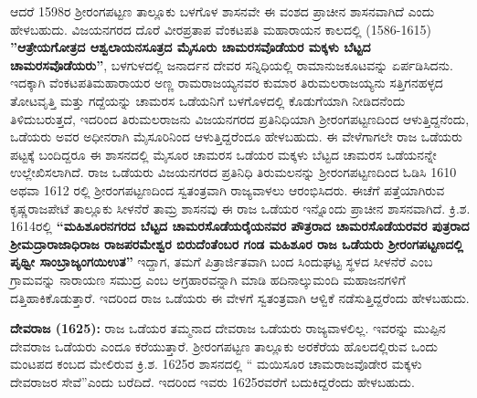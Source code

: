 ಆದರೆ 1598ರ ಶ‍್ರೀರಂಗಪಟ್ಟಣ ತಾಲ್ಲೂಕು ಬಳಗೊಳ ಶಾಸನವೇ ಈ ವಂಶದ ಪ್ರಾಚೀನ ಶಾಸನವಾಗಿದೆ ಎಂದು ಹೇಳಬಹುದು. ವಿಜಯನಗರದ ದೊರೆ ವೀರಪ್ರತಾಪ ವೆಂಕಟಪತಿ ಮಹಾರಾಯನ ಕಾಲದಲ್ಲಿ (1586-1615) \textbf{''ಆತ್ರೇಯಗೋತ್ರದ ಆಶ್ವಲಾಯನ\-ಸೂತ್ರದ ಮೈಸೂರು ಚಾಮರಸವೊಡೆಯರ ಮಕ್ಕಳು ಬೆಟ್ಟದ ಚಾಮರಸವೊಡೆಯರು''}, ಬಳಗುಳದಲ್ಲಿ ಜನಾರ್ದನ ದೇವರ ಸನ್ನಿಧಿಯಲ್ಲಿ ರಾಮಾನುಜಕೂಟವನ್ನು ಏರ್ಪಡಿಸಿದನು. ಇದಕ್ಕಾಗಿ ವೆಂಕಟಪತಿಮಹಾರಾಯರ ಅಣ್ಣ ರಾಮರಾಜಯ್ಯ\-ನವರ ಕುಮಾರ ತಿರುಮಲರಾಜಯ್ಯನು ಸತ್ತಿಗನಹಳ್ಳದ ತೋಟವೃತ್ತಿ ಮತ್ತು ಗದ್ದೆಯನ್ನು ಚಾಮರಸ ಒಡೆಯನಿಗೆ ಬಳಗೊಳದಲ್ಲಿ ಕೊಡುಗೆಯಾಗಿ ನೀಡಿದನೆಂದು ತಿಳಿದುಬರುತ್ತದೆ, ಇದರಿಂದ ತಿರುಮಲರಾಜನು ವಿಜಯನಗರದ ಪ್ರತಿನಿಧಿಯಾಗಿ ಶ‍್ರೀರಂಗಪಟ್ಟಣದಿಂದ ಆಳುತ್ತಿದ್ದನೆಂದು, ಒಡೆಯರು ಅವರ ಅಧೀನರಾಗಿ ಮೈಸೂರಿನಿಂದ ಆಳುತ್ತಿದ್ದರೆಂದೂ ಹೇಳಬಹುದು. ಈ ವೇಳೆಗಾಗಲೇ ರಾಜ ಒಡೆಯರು ಪಟ್ಟಕ್ಕೆ ಬಂದಿದ್ದರೂ ಈ ಶಾಸನದಲ್ಲಿ ಮೈಸೂರ ಚಾಮರಸ ಒಡೆಯರ ಮಕ್ಕಳು ಬೆಟ್ಟದ ಚಾಮರಸ ಒಡೆಯನನ್ನೇ ಉಲ್ಲೇಖಿಸ\-ಲಾಗಿದೆ. ರಾಜ ಒಡೆಯರು ವಿಜಯನಗರದ ಪ್ರತಿನಿಧಿ ತಿರುಮಲನನ್ನು ಶ‍್ರೀರಂಗಪಟ್ಟಣದಿಂದ ಓಡಿಸಿ 1610 ಅಥವಾ 1612 ರಲ್ಲಿ ಶ‍್ರೀರಂಗಪಟ್ಟಣದಿಂದ ಸ್ವತಂತ್ರವಾಗಿ ರಾಜ್ಯವಾಳಲು ಆರಂಭಿಸಿದರು. ಈಚೆಗೆ ಪತ್ತೆಯಾಗಿರುವ ಕೃಷ್ಣರಾಜಪೇಟೆ ತಾಲ್ಲೂಕು ಸೀಳನೆರೆ ತಾಮ್ರ ಶಾಸನವು ಈ ರಾಜ ಒಡೆಯರ ಇನ್ನೊಂದು ಪ್ರಾಚೀನ ಶಾಸನವಾಗಿದೆ. ಕ್ರಿ.ಶ. 1614ರಲ್ಲಿ \textbf{“ಮಹಿಶೂರನಗರದ ಬೆಟ್ಟದ ಚಾಮರಸೊಡೆಯರೈಯನವರ ಪೌತ್ರರಾದ ಚಾಮರಸೊಡೆಯರವರ ಪುತ್ರರಾದ ಶ‍್ರೀಮದ್ರಾರಾಜಾಧಿರಾಜ ರಾಜಪರಮೇಶ್ವರ ಬಿರುದೆಂತೆಂಬರ ಗಂಡ ಮಹಿಶೂರ ರಾಜ ಒಡೆಯರು ಶ‍್ರೀರಂಗಪಟ್ಟಣದಲ್ಲಿ ಪೃಥ್ವೀ ಸಾಂಬ್ರಾಜ್ಯಂಗಯಿಉತ”} ಇದ್ದಾಗ, ತಮಗೆ ಪಿತ್ರಾರ್ಜಿತವಾಗಿ ಬಂದ ಸಿಂದುಘಟ್ಟ ಸ್ಥಳದ ಸೀಳನೆರೆ ಎಂಬ ಗ್ರಾಮವನ್ನು ನಾರಾಯಣ ಸಮುದ್ರ ಎಂಬ ಅಗ್ರಹಾರವನ್ನಾಗಿ ಮಾಡಿ ಹದಿನಾಲ್ಕುಮಂದಿ ಮಹಾಜನಗಳಿಗೆ ದತ್ತಿಹಾಕಿಕೊಡುತ್ತಾರೆ. ಇದರಿಂದ ರಾಜ ಒಡೆಯರು ಈ ವೇಳಗೆ ಸ್ವತಂತ್ರವಾಗಿ ಆಳ್ವಿಕೆ ನಡೆಸುತ್ತಿದ್ದರೆಂದು ಹೇಳಬಹುದು.

\textbf{ದೇವರಾಜ (1625): } ರಾಜ ಒಡೆಯರ ತಮ್ಮನಾದ ದೇವರಾಜ ಒಡೆಯರು ರಾಜ್ಯವಾಳಲಿಲ್ಲ. ಇವರನ್ನು ಮುಪ್ಪಿನ ದೇವರಾಜ ಒಡೆಯರು ಎಂದೂ ಕರೆಯುತ್ತಾರೆ. ಶ‍್ರೀರಂಗಪಟ್ಟಣ ತಾಲ್ಲೂಕು ಅರಕೆರೆಯ ಹೊಲದಲ್ಲಿರುವ ಒಂದು ಮಂಟಪದ ಕಂಬದ ಮೇಲಿರುವ ಕ್ರಿ.ಶ. 1625ರ ಶಾಸನದಲ್ಲಿ “ ಮಯಿಸೂರ ಚಾಮರಾಜವೊಡೇರ ಮಕ್ಕಳು ದೇವರಾಜರ ಸೇವೆ”ಎಂದು ಬರೆದಿದೆ. ಇದರಿಂದ ಇವರು 1625ರವರೆಗೆ ಬದುಕಿದ್ದರೆಂದು ಹೇಳಬಹುದು.

